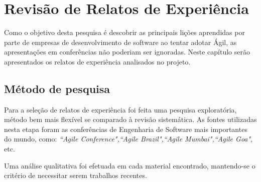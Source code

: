 \chapter{Revisão de Relatos de Experiência}
	Como o objetivo desta pesquisa é descobrir as principais lições aprendidas por parte de empresas de desenvolvimento de software ao tentar adotar Ágil, as apresentações em conferências não poderiam ser ignoradas. Neste capítulo serão apresentados os relatos de experiência analisados no projeto.
	\section{Método de pesquisa}
	Para a seleção de relatos de experiência foi feita uma pesquisa exploratória, método bem mais flexível se comparado à revisão sistemática. As fontes utilizadas nesta etapa foram as conferências de Engenharia de Software mais importantes do mundo, como: \textit{``Agile Conference",``Agile Brazil",``Agile Mumbai",``Agile Goa"}, etc.

	Uma análise qualitativa foi efetuada em cada material encontrado, mantendo-se o critério de necessitar serem trabalhos recentes.
